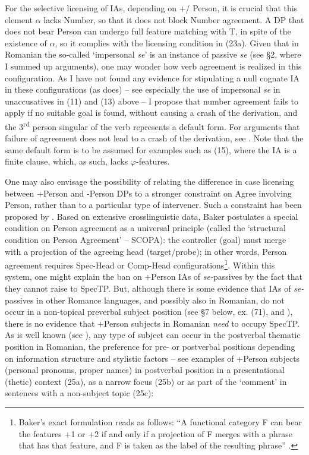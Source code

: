 \documentclass[output=paper]{langsci/langscibook}
\begin{document}
For the selective licensing of IAs, depending on +/\textminus{} Person, it is crucial that this element $\alpha $ lacks Number, so that it does not block Number agreement. A DP that does not bear Person can undergo full feature matching with T, in spite of the existence of $\alpha $, so it complies with the licensing condition in (23a). Given that in Romanian the so-called ‘impersonal \textit{se}' is an instance of passive \textit{se} (see §2, where I summed up  arguments), one may wonder how verb agreement is realized in this configuration. As I have not found any evidence for stipulating a null cognate IA in these configurations (as \citealt{Dobrovie-Sorin1998} does) – see especially the use of impersonal \textit{se} in unaccusatives in (11) and (13) above – I propose that number agreement fails to apply if no suitable goal is found, without causing a crash of the derivation, and the 3\textsuperscript{rd} person singular of the verb represents a default form. For arguments that failure of agreement does not lead to a crash of the derivation, see \citet{Preminger2014}. Note that the same default form is to be assumed for examples such as (15), where the IA is a finite clause, which, as such, lacks $\varphi $-features.

One may also envisage the possibility of relating the difference in case licensing between +Person and -Person DPs to a stronger constraint on Agree involving Person, rather than to a particular type of intervener. Such a constraint has been proposed by \citet{Baker2008}. Based on extensive crosslinguistic data, Baker postulates a special condition on Person agreement as a universal principle (called the ‘structural condition on Person Agreement' – SCOPA): the controller (goal) must merge with a projection of the agreeing head (target\slash probe); in other words, Person agreement requires Spec-Head or Comp-Head configurations\footnote{Baker’s exact formulation reads as follows: “A functional category F can bear the features +1 or +2 if and only if a projection of F merges with a phrase that has that feature, and F is taken as the label of the resulting phrase” \citep[52]{Baker2008}.}. Within this system, one might explain the ban on +Person IAs of \textit{se-}passives by the fact that they cannot raise to SpecTP. But, although there is some evidence that IAs of \textit{se-}passives in other Romance languages, and possibly also in Romanian, do not occur in a non-topical preverbal subject position (see §7 below, ex. (71), and \citealt{Raposo1996,Cornilescu1998,Dobrovie-Sorin2006}), there is no evidence that +Person subjects in Romanian \textit{need} to occupy SpecTP. As is well known (see \citealt{Dobrovie-Sorin1987,Dobrovie-Sorin1994,Cornilescu1997,Alboiu2002}), any type of subject can occur in the postverbal thematic position in Romanian, the preference for pre- or postverbal positions depending on information structure and stylistic factors – see examples of +Person subjects (personal pronouns, proper names) in postverbal position in a presentational (thetic) context (25a), as a narrow focus (25b) or as part of the ‘comment' in sentences with a non-subject topic (25c):
\end{document}

